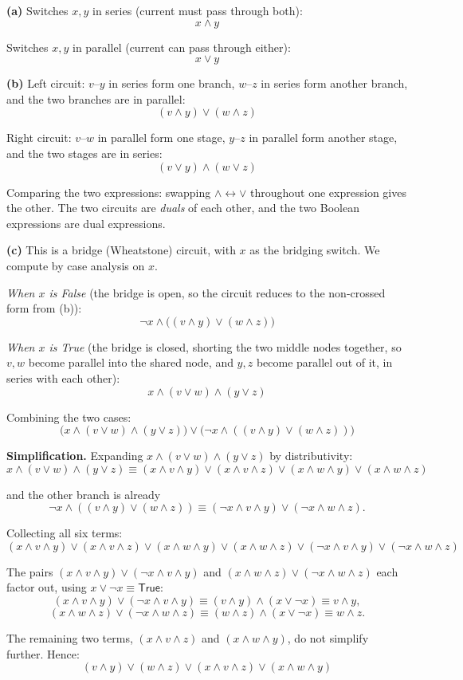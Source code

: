 \documentclass[11pt]{article}
\begin{document}
\begin{solution}
\textbf{(a)} Switches $x,y$ in series (current must pass through both):
\[
x\wedge y
\]

Switches $x,y$ in parallel (current can pass through either):
\[
x\vee y
\]

\bigskip
\textbf{(b)} Left circuit: $v$--$y$ in series form one branch, $w$--$z$ in series form another branch, and the two branches are in parallel:
\[
(v\wedge y)\vee(w\wedge z)
\]

Right circuit: $v$--$w$ in parallel form one stage, $y$--$z$ in parallel form another stage, and the two stages are in series:
\[
(v\vee y)\wedge(w\vee z)
\]

Comparing the two expressions: swapping $\wedge\leftrightarrow\vee$ throughout one expression gives the other. The two circuits are \emph{duals} of each other, and the two Boolean expressions are dual expressions.

\bigskip
\textbf{(c)} This is a bridge (Wheatstone) circuit, with $x$ as the bridging switch. We compute by case analysis on $x$.

\smallskip
\emph{When $x$ is False} (the bridge is open, so the circuit reduces to the non-crossed form from (b)):
\[
\neg x\wedge\big((v\wedge y)\vee(w\wedge z)\big)
\]

\smallskip
\emph{When $x$ is True} (the bridge is closed, shorting the two middle nodes together, so $v,w$ become parallel into the shared node, and $y,z$ become parallel out of it, in series with each other):
\[
x\wedge (v\vee w)\wedge(y\vee z)
\]

\smallskip
Combining the two cases:
\[
\big(x\wedge(v\vee w)\wedge(y\vee z)\big)\vee\big(\neg x\wedge((v\wedge y)\vee(w\wedge z))\big)
\]

\bigskip
\textbf{Simplification.} Expanding $x\wedge(v\vee w)\wedge(y\vee z)$ by distributivity:
\[
x\wedge(v\vee w)\wedge(y\vee z) \equiv (x\wedge v\wedge y)\vee(x\wedge v\wedge z)\vee(x\wedge w\wedge y)\vee(x\wedge w\wedge z)
\]

and the other branch is already
\[
\neg x\wedge((v\wedge y)\vee(w\wedge z)) \equiv (\neg x\wedge v\wedge y)\vee(\neg x\wedge w\wedge z).
\]

Collecting all six terms:
\[
(x\wedge v\wedge y)\vee(x\wedge v\wedge z)\vee(x\wedge w\wedge y)\vee(x\wedge w\wedge z)\vee(\neg x\wedge v\wedge y)\vee(\neg x\wedge w\wedge z)
\]

The pairs $(x\wedge v\wedge y)\vee(\neg x\wedge v\wedge y)$ and $(x\wedge w\wedge z)\vee(\neg x\wedge w\wedge z)$ each factor out, using $x\vee\neg x\equiv\mathsf{True}$:
\[
(x\wedge v\wedge y)\vee(\neg x\wedge v\wedge y)\equiv (v\wedge y)\wedge(x\vee\neg x)\equiv v\wedge y,
\]
\[
(x\wedge w\wedge z)\vee(\neg x\wedge w\wedge z)\equiv (w\wedge z)\wedge(x\vee\neg x)\equiv w\wedge z.
\]

The remaining two terms, $(x\wedge v\wedge z)$ and $(x\wedge w\wedge y)$, do not simplify further. Hence:
\[
(v\wedge y)\vee(w\wedge z)\vee(x\wedge v\wedge z)\vee(x\wedge w\wedge y)
\]
\end{solution}
\end{document}
